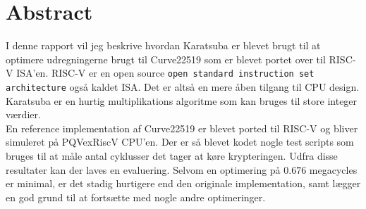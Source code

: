 \section{Abstract}
I denne rapport vil jeg beskrive hvordan Karatsuba er blevet brugt til at optimere udregningerne brugt til Curve22519 som er blevet portet over til RISC-V ISA'en. RISC-V er en open source \texttt{open standard instruction set architecture} også kaldet ISA. Det er altså en mere åben tilgang til CPU design.
\\
Karatsuba er en hurtig multiplikations algoritme som kan bruges til store integer værdier.\\En reference implementation af Curve22519 er blevet ported til RISC-V og bliver simuleret på PQVexRiscV CPU'en. Der er så blevet kodet nogle test scripts som bruges til at måle antal cyklusser det tager at køre krypteringen.  
Udfra disse resultater kan der laves en evaluering. Selvom en optimering på $0.676$ megacycles er minimal, er det stadig hurtigere end den originale implementation, samt lægger en god grund til at fortsætte med nogle andre optimeringer.
